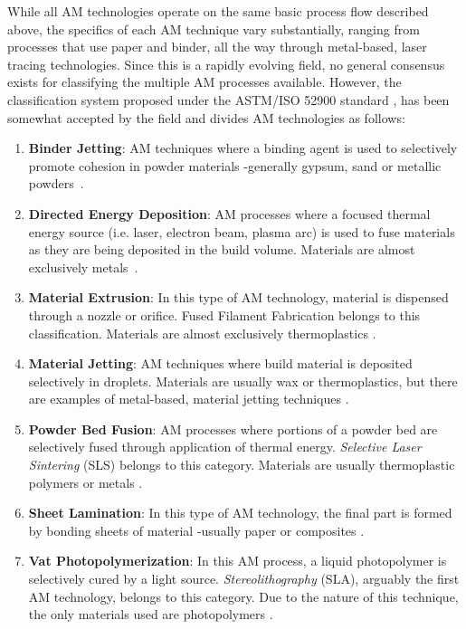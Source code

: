 \documentclass[main.tex]{subfiles}
\begin{document}
While all AM technologies operate on the same basic process flow described above, the specifics of each AM technique vary substantially, ranging from processes that use paper and binder, all the way through metal-based, laser tracing technologies. Since this is a rapidly evolving field, no general consensus exists for classifying the multiple AM processes available. However, the classification system proposed under the ASTM/ISO 52900 standard \cite{ASTM52900}, has been somewhat accepted by the field and divides AM technologies as follows:
\begin{enumerate}
	\item \textbf{Binder Jetting}: AM techniques where a binding agent is used to selectively promote cohesion in powder materials -generally gypsum, sand or metallic powders~\cite{ASTM52900,3DHubs2018}.
	\item \textbf{Directed Energy Deposition}: AM processes where a focused thermal energy source (i.e. laser, electron beam, plasma arc) is used to fuse materials as they are being deposited in the build volume. Materials are almost exclusively metals~\cite{ASTM52900,3DHubs2018}.
	\item \textbf{Material Extrusion}: In this type of AM technology, material is dispensed through a nozzle or orifice. Fused Filament Fabrication belongs to this classification. Materials are almost exclusively thermoplastics \cite{ASTM52900,3DHubs2018}.
	\item \textbf{Material Jetting}: AM techniques where build material is deposited selectively in droplets. Materials are usually wax or thermoplastics, but there are examples of metal-based, material jetting techniques \cite{ASTM52900,3DHubs2018}.
	\item \textbf{Powder Bed Fusion}: AM processes where portions of a powder bed are selectively fused through application of thermal energy. \emph{Selective Laser Sintering} (SLS) belongs to this category. Materials are usually thermoplastic polymers or metals \cite{ASTM52900,3DHubs2018}. 
	\item \textbf{Sheet Lamination}: In this type of AM technology, the final part is formed by bonding sheets of material -usually paper or composites \cite{ASTM52900,3DHubs2018}. 
	\item \textbf{Vat Photopolymerization}: In this AM process, a liquid photopolymer is selectively cured by a light source. \emph{Stereolithography} (SLA), arguably the first AM technology, belongs to this category. Due to the nature of this technique, the only materials used are photopolymers \cite{ASTM52900,3DHubs2018}.
\end{enumerate} 
\end{document}
